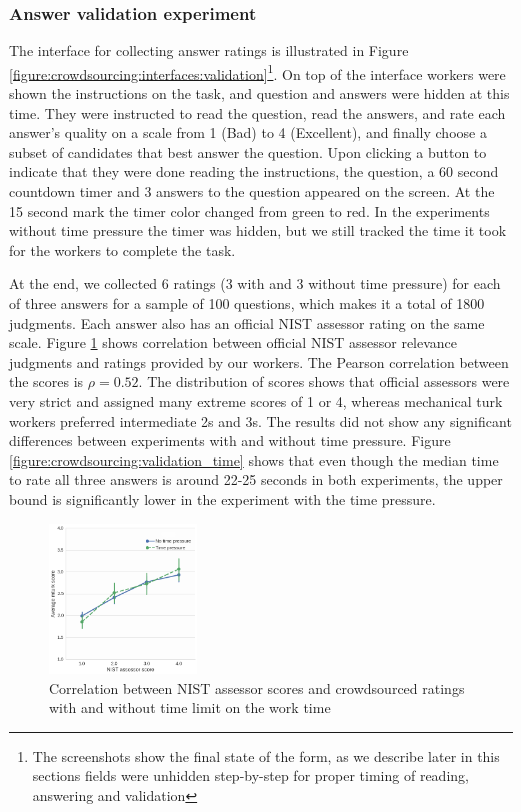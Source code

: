 \subsubsection{Answer validation experiment}
\label{section:crowdsourcing:approach:experiments:validation}

The interface for collecting answer ratings is illustrated in Figure \ref{figure:crowdsourcing:interfaces:validation}\footnote{The screenshots show the final state of the form, as we describe later in this sections fields were unhidden step-by-step for proper timing of reading, answering and validation}.
On top of the interface workers were shown the instructions on the task, and question and answers were hidden at this time.
They were instructed to read the question, read the answers, and rate each answer's quality on a scale from 1 (Bad) to 4 (Excellent), and finally choose a subset of candidates that best answer the question.
Upon clicking a button to indicate that they were done reading the instructions, the question, a 60 second countdown timer and 3 answers to the question appeared on the screen.
At the 15 second mark the timer color changed from green to red.
In the experiments without time pressure the timer was hidden, but we still tracked the time it took for the workers to complete the task.

At the end, we collected 6 ratings (3 with and 3 without time pressure) for each of three answers for a sample of 100 questions, which makes it a total of 1800 judgments.
Each answer also has an official NIST assessor rating on the same scale.
Figure \ref{figure:crowdsourcing:score_correlation} shows correlation between official NIST assessor relevance judgments and ratings provided by our workers.
The Pearson correlation between the scores is $\rho=0.52$.
The distribution of scores shows that official assessors were very strict and assigned many extreme scores of 1 or 4, whereas mechanical turk workers preferred intermediate 2s and 3s.
The results did not show any significant differences between experiments with and without time pressure.
Figure \ref{figure:crowdsourcing:validation_time} shows that even though the median time to rate all three answers is around 22-25 seconds in both experiments, the upper bound is significantly lower in the experiment with the time pressure.

\begin{figure}
	\centering
	\includegraphics[width=0.35\textwidth]{img/score_correlation}
	\caption{Correlation between NIST assessor scores and crowdsourced ratings with and without time limit on the work time}
	\label{figure:crowdsourcing:score_correlation}
\end{figure}

